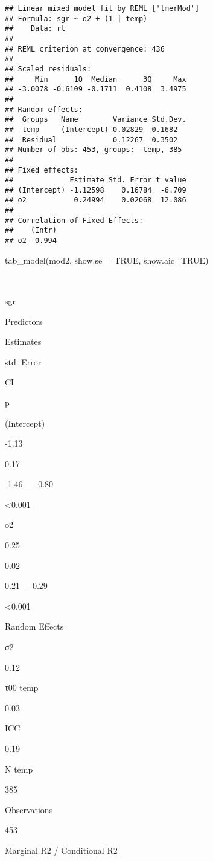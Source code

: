 \documentclass[
]{article}
\newenvironment{Shaded}{\begin{snugshade}}{\end{snugshade}}
\newcommand{\AttributeTok}[1]{\textcolor[rgb]{0.77,0.63,0.00}{#1}}
\newcommand{\ConstantTok}[1]{\textcolor[rgb]{0.00,0.00,0.00}{#1}}
\newcommand{\FunctionTok}[1]{\textcolor[rgb]{0.00,0.00,0.00}{#1}}
\newcommand{\NormalTok}[1]{#1}
\begin{document}
\begin{verbatim}
## Linear mixed model fit by REML ['lmerMod']
## Formula: sgr ~ o2 + (1 | temp)
##    Data: rt
## 
## REML criterion at convergence: 436
## 
## Scaled residuals: 
##     Min      1Q  Median      3Q     Max 
## -3.0078 -0.6109 -0.1711  0.4108  3.4975 
## 
## Random effects:
##  Groups   Name        Variance Std.Dev.
##  temp     (Intercept) 0.02829  0.1682  
##  Residual             0.12267  0.3502  
## Number of obs: 453, groups:  temp, 385
## 
## Fixed effects:
##             Estimate Std. Error t value
## (Intercept) -1.12598    0.16784  -6.709
## o2           0.24994    0.02068  12.086
## 
## Correlation of Fixed Effects:
##    (Intr)
## o2 -0.994
\end{verbatim}

\begin{Shaded}
\begin{Highlighting}[]
\FunctionTok{tab\_model}\NormalTok{(mod2, }\AttributeTok{show.se =} \ConstantTok{TRUE}\NormalTok{, }\AttributeTok{show.aic=}\ConstantTok{TRUE}\NormalTok{)}
\end{Highlighting}
\end{Shaded}

~

sgr

Predictors

Estimates

std. Error

CI

p

(Intercept)

-1.13

0.17

-1.46~--~-0.80

\textless0.001

o2

0.25

0.02

0.21~--~0.29

\textless0.001

Random Effects

σ2

0.12

τ00 temp

0.03

ICC

0.19

N temp

385

Observations

453

Marginal R2 / Conditional R2
\end{document}
